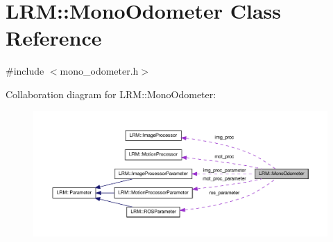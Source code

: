 \hypertarget{classLRM_1_1MonoOdometer}{\section{\-L\-R\-M\-:\-:\-Mono\-Odometer \-Class \-Reference}
\label{classLRM_1_1MonoOdometer}
}


{\ttfamily \#include $<$mono\-\_\-odometer.\-h$>$}



\-Collaboration diagram for \-L\-R\-M\-:\-:\-Mono\-Odometer\-:\nopagebreak
\begin{figure}[H]
\begin{center}
\leavevmode
\includegraphics[width=350pt]{classLRM_1_1MonoOdometer__coll__graph}
\end{center}
\end{figure}
